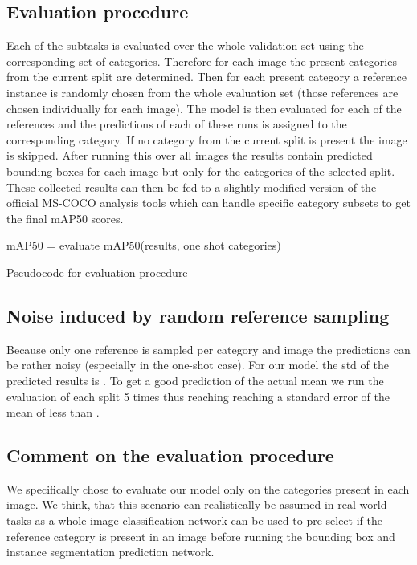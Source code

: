\documentclass{article}
\newcommand{\coco}{MS-COCO\xspace}
\begin{document}
\subsection{Evaluation procedure}
Each of the subtasks is evaluated over the whole validation set using the corresponding set of categories. Therefore for each image the present categories from the current split are determined. Then for each present category a reference instance is randomly chosen from the whole evaluation set (those references are chosen individually for each image). The model is then evaluated for each of the references and the predictions of each of these runs is assigned to the corresponding category. If no category from the current split is present the image is skipped. After running this over all images the results contain predicted bounding boxes for each image but only for the categories of the selected split. These collected results can then be fed to a slightly modified version of the official \coco analysis tools \cite{Coco2018} which can handle specific category subsets to get the final mAP50 scores.

\begin{algorithm}[H]
 mAP50 = evaluate mAP50(results, one shot categories)\;
 \vspace{6pt}
 \caption{Pseudocode for evaluation procedure}
\end{algorithm}

\subsection{Noise induced by random reference sampling}
Because only one reference is sampled per category and image the predictions can be rather noisy (especially in the one-shot case). For our model the std of the predicted results is . To get a good prediction of the actual mean we run the evaluation of each split 5 times thus reaching reaching a standard error of the mean of less than .

\subsection{Comment on the evaluation procedure}
We specifically chose to evaluate our model only on the categories present in each image. We think, that this scenario can realistically be assumed in real world tasks as a whole-image classification network can be used to pre-select if the reference category is present in an image before running the bounding box and instance segmentation prediction network.
\end{document}
